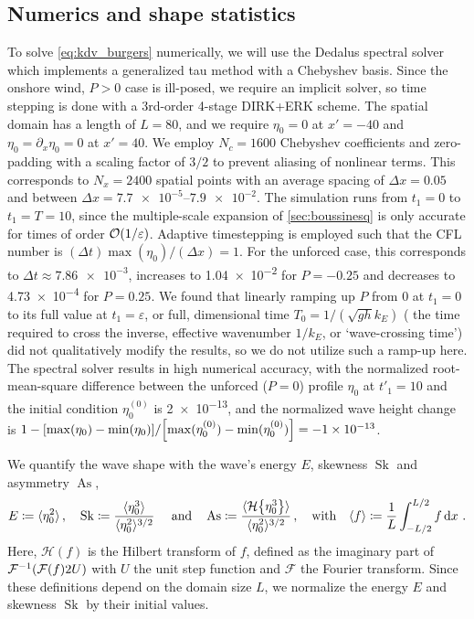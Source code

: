 \documentclass{jfm}
\DeclareMathOperator{\Sk}{Sk}
\DeclareMathOperator{\As}{As}
\newcommand{\fourier}{\mathcal{F}}
\newcommand{\hilbert}{\mathcal{H}}
\renewcommand*{\epsilon}{\varepsilon}
\begin{document}
\subsection{\label{sec:numerics} Numerics and shape statistics}
To solve \cref{eq:kdv_burgers} numerically, we will use the Dedalus
spectral solver~\citep{burns2020dedalus} which implements a generalized
tau method with a Chebyshev basis.
Since the onshore wind, $P>0$ case is ill-posed, we require an implicit
solver, so time stepping is done with a 3rd-order 4-stage DIRK+ERK
scheme.
The spatial domain has a length of $L=80$, and we require $\eta_0 = 0$
at $x' = -40$ and $\eta_0 = \partial_x \eta_0 = 0$ at $x' = 40$.
We employ $N_c = 1600$ Chebyshev coefficients and zero-padding with a
scaling factor of $3/2$ to prevent aliasing of nonlinear terms.
This corresponds to $N_x = 2400$ spatial points with an average spacing
of $\Delta x = 0.05$ and between $\Delta x = \numrange{7.7e-5}{7.9e-2}$.
The simulation runs from $t_1 = 0$ to $t_1 = T = 10$, since the
multiple-scale expansion of \cref{sec:boussinesq} is only accurate for
times of order $\order{1/\epsilon}$.
Adaptive timestepping is employed such that the CFL number is $(\Delta
t) \max(\eta_0)/(\Delta x) = 1$.
For the unforced case, this corresponds to $\Delta t \approx
\num{7.86e-3}$, increases to \num{1.04e-2} for $P=-0.25$ and
decreases to \num{4.73e-4} for $P = 0.25$.
We found that linearly ramping up $P$ from $0$ at $t_1=0$ to its full
value at $t_1 = \epsilon$, or full, dimensional time $T_0 = 1/(\sqrt{gh}
k_E)$ (\ie{} the time required to cross the inverse, effective
wavenumber $1/k_E$, or `wave-crossing time') did not qualitatively
modify the results, so we do not utilize such a ramp-up here.
The spectral solver results in high numerical accuracy, with the
normalized root-mean-square difference between the unforced ($P=0$)
profile $\eta_0$ at $t'_1=10$ and the initial condition $\eta^{(0)}_0$
is \num{2e-13}, and the normalized wave height change is
$1-\bqty{\max(\eta_0) - \min(\eta_0)}/\allowbreak
\bqty{\max(\eta^{(0)}_0) - \min(\eta^{(0)}_0)} = \num{-1e-13}$.

We quantify the wave shape with the wave's energy $E$, skewness $\Sk$
and asymmetry $\As$,
\begin{equation}
  E \coloneqq \langle \eta_0^2 \rangle \,, \quad
  \Sk \coloneqq \frac{\langle \eta_0^3 \rangle}{\langle \eta_0^2
  \rangle^{3/2}} \
  \qq{and}
  \As \coloneqq \frac{\langle \hilbert \Bqty{\eta_0^3} \rangle}{\langle
    \eta_0^2 \rangle^{3/2}}
  \,, \qq{with}
  \langle f \rangle \coloneqq \frac{1}{L} \int_{-L/2}^{L/2} f
  \dd{x} \,.
  \label{eq:shape_stats_def}
\end{equation}
Here, $\hilbert(f)$ is the Hilbert transform of $f$, defined as the
imaginary part of $\fourier^{-1} \pqty{ \fourier \pqty{f} 2U}$ with $U$
the unit step function and $\fourier$ the Fourier transform.
Since these definitions depend on the domain size $L$, we normalize the
energy $E$ and skewness $\Sk$ by their initial values.
\end{document}
